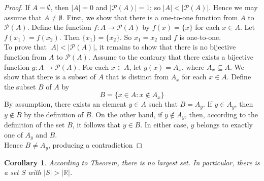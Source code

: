 \documentclass[10pt]{report}
\newtheorem{cor2}{Corollary}[section]
\begin{document}
\begin{proof}
If $A=\emptyset$, then $|A|=0$ and $|\mathcal{P}(A)|=1$; so $|A|<|\mathcal{P}(A)|$. Hence we may assume that $A\neq\emptyset$. First, we show that there is a one-to-one function from $A$ to $\mathcal{P}(A)$. Define the function $f:A\to \mathcal{P}(A)$ by $f(x)=\{x\}$ for each $x\in A$. Let $f(x_1)=f(x_2)$. Then $\{x_1\}=\{x_2\}$. So $x_1=x_2$ and $f$ is one-to-one.\\
To prove that $|A|<|\mathcal{P}(A)|$, it remains to show that there is no bijective function from $A$ to $\mathcal{P}(A)$. Assume to the contrary that there exists a bijective function $g:A\to \mathcal{P}(A)$. For each $x\in A$, let $g(x)=A_x$, where $A_x\subseteq A$. We show that there is a subset of $A$ that is distinct from $A_x$ for each $x\in A$. Define the subset $B$ of $A$ by
$$B=\{x\in A: x\notin A_x\}$$
By assumption, there exists an element $y\in A$ such that $B= A_y$. If $y\in A_y$, then $y\notin B$ by the definition of $B$. On the other hand, if $y\notin A_y$, then, according to the definition of the set $B$, it follows that $y\in B$. In either case, $y$ belongs to exactly one of $A_y$ and $B$.\\
Hence $B\neq A_y$, producing a contradiction
\end{proof}
\begin{cor2}
According to Theorem, there is no largest set. In particular, there is a set $S$ with $|S|>|\mathbb{R}|$.
\end{cor2}
\end{document}
